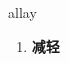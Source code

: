
\begin{frame}
{\huge allay}
\begin{center}
\begin{enumerate}\Large
  \item \textbf{减轻}
\end{enumerate}
\end{center}
\end{frame}
